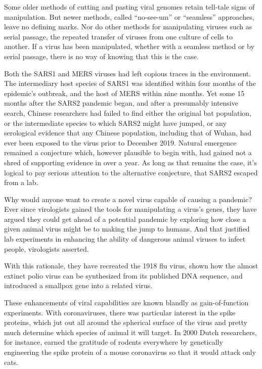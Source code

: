 \documentclass[
]{book}
\begin{document}
Some older methods of cutting and pasting viral genomes retain tell-tale signs of manipulation. But newer methods, called ``no-see-um'' or ``seamless'' approaches, leave no defining marks. Nor do other methods for manipulating viruses such as serial passage, the repeated transfer of viruses from one culture of cells to another. If a virus has been manipulated, whether with a seamless method or by serial passage, there is no way of knowing that this is the case.

Both the SARS1 and MERS viruses had left copious traces in the environment. The intermediary host species of SARS1 was identified within four months of the epidemic's outbreak, and the host of MERS within nine months. Yet some 15 months after the SARS2 pandemic began, and after a presumably intensive search, Chinese researchers had failed to find either the original bat population, or the intermediate species to which SARS2 might have jumped, or any serological evidence that any Chinese population, including that of Wuhan, had ever been exposed to the virus prior to December 2019. Natural emergence remained a conjecture which, however plausible to begin with, had gained not a shred of supporting evidence in over a year.
As long as that remains the case, it's logical to pay serious attention to the alternative conjecture, that SARS2 escaped from a lab.

Why would anyone want to create a novel virus capable of causing a pandemic? Ever since virologists gained the tools for manipulating a virus's genes, they have argued they could get ahead of a potential pandemic by exploring how close a given animal virus might be to making the jump to humans. And that justified lab experiments in enhancing the ability of dangerous animal viruses to infect people, virologists asserted.

With this rationale, they have recreated the 1918 flu virus, shown how the almost extinct polio virus can be synthesized from its published DNA sequence, and introduced a smallpox gene into a related virus.

These enhancements of viral capabilities are known blandly as gain-of-function experiments. With coronaviruses, there was particular interest in the spike proteins, which jut out all around the spherical surface of the virus and pretty much determine which species of animal it will target. In 2000 Dutch researchers, for instance, earned the gratitude of rodents everywhere by genetically engineering the spike protein of a mouse coronavirus so that it would attack only cats.
\end{document}
